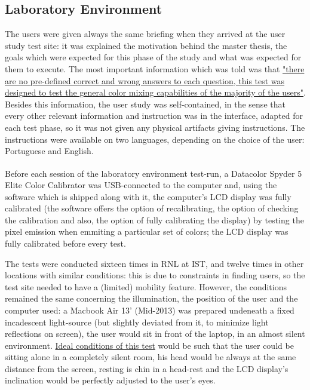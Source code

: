 \subsection{Laboratory Environment}
%
The users were given always the same briefing when they arrived at the user study test site: it was explained the motivation behind the master
thesis, the goals which were expected for this phase of the study and what was expected for them to execute. The most important information which
was told was that \ul{"there are no pre-defined correct and wrong answers to each question, this test was designed to test the general
color mixing capabilities of the majority of the users"}. Besides this information, the user study was self-contained, in the sense that
every other relevant information and instruction was in the interface, adapted for each test phase, so it was not given any physical artifacts
giving instructions. The instructions were available on two languages, depending on the choice of the user: Portuguese and English. \par
%
Before each session of the laboratory environment test-run, a Datacolor\textsuperscript{\textregistered} Spyder 5 Elite Color Calibrator was USB-connected to the computer and, using
the software which is shipped along with it, the computer's LCD display was fully calibrated (the software offers the option of recalibrating,
the option of checking the calibration and also, the option of fully calibrating the display) by testing the pixel emission when emmiting a particular
set of colors; the LCD display was fully calibrated before every test. \par
%
The tests were conducted sixteen times in \gls{RNL} at \gls{IST}, and twelve times in other locations with similar conditions:
this is due to constraints in finding users, so the test site needed to have a (limited) mobility feature. However, the conditions remained
the same concerning the illumination, the position of the user and the computer used: a Macbook Air 13' (Mid-2013) was prepared undeneath
a fixed incadescent light-source (but slightly deviated from it, to minimize light reflections on screen), the user would sit in front
of the laptop, in an almost silent environment. \ul{Ideal conditions of this test} would be such that the user could be sitting alone in a completely
silent room, his head would be always at the same distance from the screen, resting is chin in a head-rest and the LCD display's inclination would be perfectly
adjusted to the user's eyes.
%
